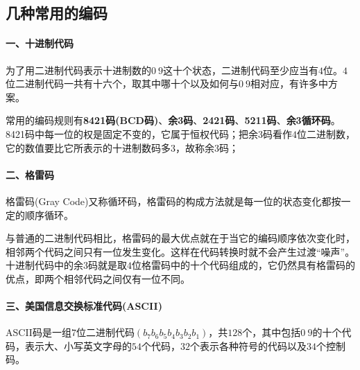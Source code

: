 \subsection{几种常用的编码}

\paragraph{一、十进制代码}
为了用二进制代码表示十进制数的$ 0~9 $这十个状态，二进制代码至少应当有$ 4 $位。$ 4 $位二进制代码一共有十六个，取其中哪十个以及如何与$ 0~9 $相对应，有许多中方案。

常用的编码规则有\textbf{8421码(BCD码)}、\textbf{余3码}、\textbf{2421码}、\textbf{5211码}、\textbf{余3循环码}。8421码中每一位的权是固定不变的，它属于恒权代码；把余3码看作$ 4 $位二进制数，它的数值要比它所表示的十进制数码多3，故称余3码；

\paragraph{二、格雷码}
格雷码(Gray Code)又称循环码，格雷码的构成方法就是每一位的状态变化都按一定的顺序循环。

与普通的二进制代码相比，格雷码的最大优点就在于当它的编码顺序依次变化时，相邻两个代码之间只有一位发生变化。这样在代码转换时就不会产生过渡“噪声”。十进制代码中的余3码就是取$ 4 $位格雷码中的十个代码组成的，它仍然具有格雷码的优点，即两个相邻代码之间仅有一位不同。

\paragraph{三、美国信息交换标准代码(ASCII)}
ASCII码是一组$ 7 $位二进制代码$ \left( b_{7}b_{6}b_{5}b_{4}b_{3}b_{2}b_{1} \right) $，共$ 128 $个，其中包括$ 0~9 $的十个代码，表示大、小写英文字母的$ 54 $个代码，$ 32 $个表示各种符号的代码以及$ 34 $个控制码。